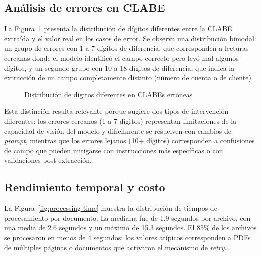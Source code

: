 \subsection{Análisis de errores en CLABE}

La Figura~\ref{fig:clabe-digit-diff} presenta la distribución de dígitos diferentes entre la CLABE extraída y el valor real en los casos de error. Se observa una distribución bimodal: un grupo de errores con 1 a 7 dígitos de diferencia, que corresponden a lecturas cercanas donde el modelo identificó el campo correcto pero leyó mal algunos dígitos, y un segundo grupo con 10 a 18 dígitos de diferencia, que indica la extracción de un campo completamente distinto (número de cuenta o de cliente).

\begin{figure}[H]
    \centering
    \caption{Distribución de dígitos diferentes en CLABEs erróneas}
    \label{fig:clabe-digit-diff}
\end{figure}

Esta distinción resulta relevante porque sugiere dos tipos de intervención diferentes: los errores cercanos (1 a 7 dígitos) representan limitaciones de la capacidad de visión del modelo y difícilmente se resuelven con cambios de \textit{prompt}, mientras que los errores lejanos (10+ dígitos) corresponden a confusiones de campo que pueden mitigarse con instrucciones más específicas o con validaciones post-extracción.

\subsection{Rendimiento temporal y costo}

La Figura~\ref{fig:processing-time} muestra la distribución de tiempos de procesamiento por documento. La mediana fue de 1.9 segundos por archivo, con una media de 2.6 segundos y un máximo de 15.3 segundos. El 85\% de los archivos se procesaron en menos de 4 segundos; los valores atípicos corresponden a PDFs de múltiples páginas o documentos que activaron el mecanismo de \textit{retry}.

